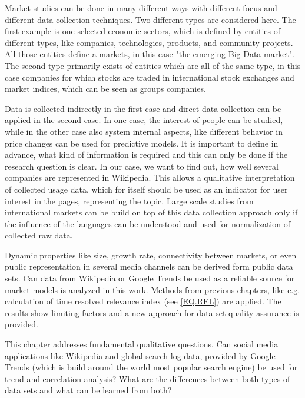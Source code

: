 \documentclass[a4paper,10pt]{scrbook}
\begin{document}
Market studies can be done in many different ways with different focus and different data collection techniques. Two different types are considered here. The first example is one selected economic sectors, which is defined by entities of different types, like companies, technologies, products, and community projects. All those entities define a markets, in this case "the emerging Big Data market". The second type primarily exists of entities which are all of the same type, in this case companies for which stocks are traded in international stock exchanges and market indices, which can be seen as groups companies. 

Data is collected indirectly in the first case and direct data collection can be applied in the second case. In one case, the interest of people can be studied, while in the other case also system internal aspects, like different behavior in price changes can be used for predictive models. It is important to define in advance, what kind of information is required and this can only be done if the research question is clear. In our case, we want to find out, how well several companies are represented in Wikipedia. This allows a qualitative interpretation of collected usage data, which for itself should be used as an indicator for user interest in the pages, representing the topic. Large scale studies from international markets can be build on top of this data collection approach only if the influence of the languages can be understood and used for normalization of collected raw data.

Dynamic properties like size, growth rate, connectivity between markets, or even public representation in several media channels can be derived form public data sets. Can data from Wikipedia or Google Trends be used as a reliable source for market models is analyzed in this work. Methods from previous chapters, like e.g. calculation of time resolved relevance index (see \ref{EQ.REL}) %
are applied. The results show limiting factors and a new approach for data set quality assurance is provided. 

This chapter addresses fundamental qualitative questions. Can social media applications like Wikipedia and global search log data, provided by Google Trends (which is build around the world most popular search engine) be used for trend and correlation analysis? What are the differences between both types of data sets and what can be learned from both? 
\end{document}
